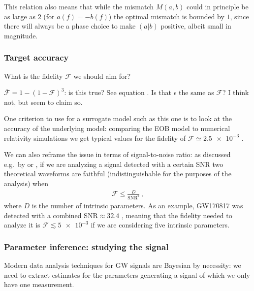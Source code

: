 \documentclass[main.tex]{subfiles}
\begin{document}
This relation also means that while the mismatch \(M(a, b)\) could in principle be as large as \(2\) (for \(a(f) = -b(f)\)) the optimal mismatch is bounded by \(1\), since there will always be a phase choice to make \((a|b)\) positive, albeit small in magnitude.


\subsubsection{Target accuracy}

What is the fidelity \(\mathcal{F}\) we should aim for? 

\(\mathcal{\overline{F}}= 1 - (1- \mathcal{F})^3\): is this true? See equation \cite[eq.\ 16]{lindblomModelWaveformAccuracy2008}. 
Is that \(\epsilon \) the same as \(\mathcal{F}\)? 
I think not, but \cite[]{gambaFastFaithfulFrequencydomain2020} seem to claim so. 

One criterion to use for a surrogate model such as this one is to look at the accuracy of the underlying model: comparing the \ac{EOB} model to numerical relativity simulations we get typical values for the fidelity of \(\mathcal{F} \simeq \num{2.5e-3}\) \cite[]{nagarTimedomainEffectiveonebodyGravitational2018}.

We can also reframe the issue in terms of signal-to-noise ratio: as discussed e.g.\ by \textcite[]{lindblomModelWaveformAccuracy2008} or \textcite[]{gambaFastFaithfulFrequencydomain2020}, if we are analyzing a signal detected with a certain \ac{SNR} two theoretical waveforms are faithful (indistinguishable for the purposes of the analysis) when 
%
\begin{align}
\mathcal{F} \leq \frac{D}{\text{SNR}^2}
\,,
\end{align}
%
where \(D\) is the number of intrinsic parameters. 
As an example, GW170817 was detected with a combined SNR\(\approx 32.4\) \cite[]{abbottGW170817ObservationGravitational2017}, meaning that the fidelity needed to analyze it is \(\mathcal{F} \lesssim \num{5e-3}\) if we are considering five intrinsic parameters.

\subsubsection{Parameter inference: studying the signal}

Modern data analysis techniques for \ac{GW} signals are Bayesian by necessity: we need to extract estimates for the parameters generating a signal of which we only have one measurement. 
\end{document}
